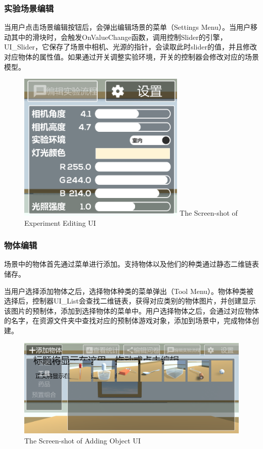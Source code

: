 \subsubsection{实验场景编辑}
当用户点击场景编辑按钮后，会弹出编辑场景的菜单（Settings Menu）。当用户移动其中的滑块时，会触发OnValueChange函数，调用控制Slider的引擎，UI\_Slider，它保存了场景中相机、光源的指针，会读取此时slider的值，并且修改对应物体的属性值。如果通过开关调整实验环境，开关的控制器会修改对应的场景模型。

\begin{figure}[!htp]
  \centering
  \includegraphics[width=8cm]{figure/settings.png}
    {The Screen-shot of Experiment Editing UI}
 \label{fig:gm}
\end{figure}

\subsubsection{物体编辑}
场景中的物体首先通过菜单进行添加。支持物体以及他们的种类通过静态二维链表储存。

	当用户选择添加物体之后，选择物体种类的菜单弹出（Tool Menu）。物体种类被选择后，控制器UI\_List会查找二维链表，获得对应类别的物体图片，并创建显示该图片的预制体，添加到选择物体的菜单中。用户选择物体之后，会通过对应物体的名字，在资源文件夹中查找对应的预制体游戏对象，添加到场景中，完成物体创建。
	
\begin{figure}[!htp]
  \centering
  \includegraphics[width=12cm]{figure/addObj.png}
    {The Screen-shot of Adding Object UI}
 \label{fig:gm}
\end{figure}

